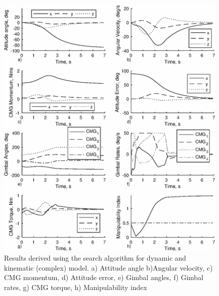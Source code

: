 \documentclass[journal]{new-aiaa}
\begin{document}
\begin{figure}[H]
\centering
\includegraphics[width=6in]{1test.eps}
\caption{Results derived using the search algorithm for dynamic and kinematic (complex) model. a) Attitude angle b)Angular velocity, c) CMG momentum, d) Attitude error, e) Gimbal angles, f) Gimbal rates, g) CMG torque, h) Manipulability index}
\label{fig:with}
\end{figure}
\end{document}
